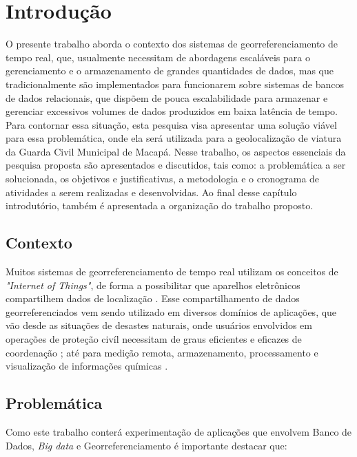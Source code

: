 %
%

\chapter{Introdução}\label{chap:introducao}  

O presente trabalho aborda o contexto dos sistemas de georreferenciamento de tempo real, que, usualmente necessitam de abordagens escaláveis para o gerenciamento e o armazenamento de grandes quantidades de dados, mas que tradicionalmente são implementados para funcionarem sobre sistemas de bancos de dados relacionais, que dispõem de pouca escalabilidade para armazenar e gerenciar excessivos volumes de dados produzidos em baixa latência de tempo. Para contornar essa situação, esta pesquisa visa apresentar uma solução viável para essa problemática, onde ela será utilizada para a geolocalização de viatura da Guarda Civil Municipal de Macapá. Nesse trabalho, os aspectos essenciais da pesquisa proposta são apresentados e discutidos, tais como: a problemática a ser solucionada, os objetivos e justificativas, a metodologia e o cronograma de atividades a serem realizadas e desenvolvidas. Ao final desse capítulo introdutório, também é apresentada a organização do trabalho proposto.

\section {Contexto}

Muitos sistemas de georreferenciamento de tempo real utilizam os conceitos de \textit{"Internet of Things"}, de forma a possibilitar que aparelhos eletrônicos compartilhem dados de localização \cite{Vega}. Esse compartilhamento de dados georreferenciados vem sendo utilizado em diversos domínios de aplicações, que vão desde as situações de desastes naturais, onde usuários envolvidos em operações de proteção civíl necessitam de graus eficientes e eficazes de coordenação \cite{Barroso}; até para medição remota, armazenamento, processamento e visualização de informações químicas \cite{Vega}.

\section{Problemática}

Como este trabalho conterá experimentação de aplicações que envolvem Banco de Dados, \textit{Big data} e Georreferenciamento é importante destacar que:

